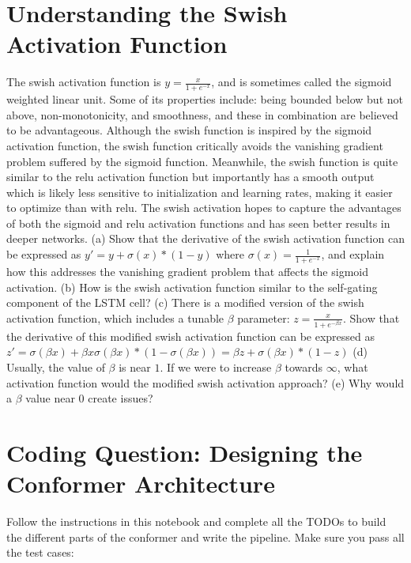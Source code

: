 \documentclass{article}
\begin{document}
\section{Understanding the Swish Activation Function}
The swish activation function is $y=\frac{x}{1+e^{-x}}$, and is sometimes called the sigmoid weighted linear unit. Some of its properties include: being bounded below but not above, non-monotonicity, and smoothness, and these in combination are believed to be advantageous. Although the swish function is inspired by the sigmoid activation function, the swish function critically avoids the vanishing gradient problem suffered by the sigmoid function. Meanwhile, the swish function is quite similar to the relu activation function but importantly has a smooth output which is likely less sensitive to initialization and learning rates, making it easier to optimize than with relu. The swish activation hopes to capture the advantages of both the sigmoid and relu activation functions and has seen better results in deeper networks.\newline\newline
(a) Show that the derivative of the swish activation function can be expressed as $y'=y+\sigma (x)*(1-y)$ where $\sigma (x)=\frac{1}{1+e^{-x}}$, and explain how this addresses the vanishing gradient problem that affects the sigmoid activation.\newline\newline
(b) How is the swish activation function similar to the self-gating component of the LSTM cell?\newline\newline
(c) There is a modified version of the swish activation function, which includes a tunable $\beta$ parameter: $z=\frac{x}{1+e^{-\beta x}}$. Show that the derivative of this modified swish activation function can be expressed as $z'=\sigma (\beta x)+\beta x \sigma (\beta x)*(1-\sigma (\beta x)) = \beta z + \sigma(\beta x) * (1-z)$\newline\newline
(d) Usually, the value of $\beta$ is near $1$. If we were to increase $\beta$ towards $\infty$, what activation function would the modified swish activation approach?\newline\newline
(e) Why would a $\beta$ value near 0 create issues?\newline\newline

\newpage
\thispagestyle{plain}
\section{Coding Question: Designing the Conformer Architecture}
Follow the instructions in this notebook and complete all the TODOs to build the different parts of the conformer and write the pipeline. Make sure you pass all the test cases: 
\href{https://colab.research.google.com/drive/1r5xv6N49ooYWbXL95672rZyXyFMNd3jL?usp=sharing}{\color{blue}{Conformers.ipynb}}
\end{document}
